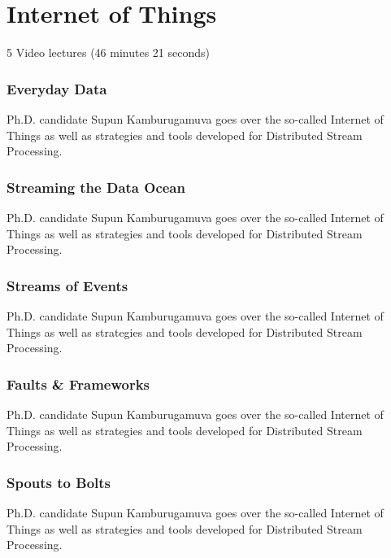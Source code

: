\part{Internet of Things}

  5 Video lectures (46 minutes 21 seconds)

\section{Everyday Data}

Ph.D. candidate Supun Kamburugamuva goes over the so-called Internet of
Things as well as strategies and tools developed for Distributed Stream
Processing.


\section{Streaming the Data Ocean}

Ph.D. candidate Supun Kamburugamuva goes over the so-called Internet of
Things as well as strategies and tools developed for Distributed Stream
Processing.


\section{Streams of Events}

Ph.D. candidate Supun Kamburugamuva goes over the so-called Internet of
Things as well as strategies and tools developed for Distributed Stream
Processing.


\section{Faults \& Frameworks}

Ph.D. candidate Supun Kamburugamuva goes over the so-called Internet of
Things as well as strategies and tools developed for Distributed Stream
Processing.


\section{Spouts to Bolts}

Ph.D. candidate Supun Kamburugamuva goes over the so-called Internet of
Things as well as strategies and tools developed for Distributed Stream
Processing.


